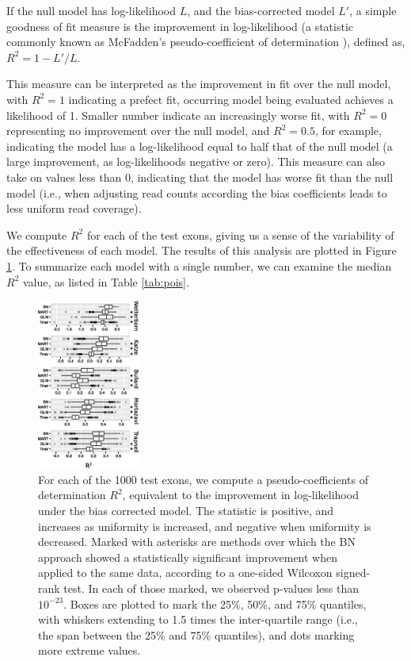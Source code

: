 \documentclass{bioinfo}
\begin{document}
If the null model has log-likelihood $L$, and the bias-corrected model $L'$, a
simple goodness of fit measure is the improvement in log-likelihood (a statistic
commonly known as McFadden's pseudo-coefficient of determination
\citep{McFadden1974}), defined as,
$R^2 = 1 - L'/L$.

This measure can be interpreted as the improvement in fit over the null model,
with $R^2 = 1$ indicating a prefect fit, occurring model being evaluated
achieves a likelihood of 1. Smaller number indicate an increasingly worse fit,
with $R^2 = 0$ representing no improvement over the null model, and $R^2 = 0.5$,
for example, indicating the model has a log-likelihood equal to half that of the
null model (a large improvement, as log-likelihoods negative or zero). This
measure can also take on values less than 0, indicating that the model has worse
fit than the null model (i.e., when adjusting read counts according the bias
coefficients leads to less uniform read coverage).

We compute $R^2$ for each of the test exons, giving us a sense of the variability
of the effectiveness of each model. The results of this analysis are plotted in
Figure \ref{fig:pois}.  To summarize each model with a single number, we can
examine the median $R^2$ value, as listed in Table \ref{tab:pois}.

\begin{figure}
\centerline{\includegraphics[width=0.30\textwidth]{pois-boxplot.eps}}
\caption{For each of the 1000 test exons, we compute a pseudo-coefficients of
determination $R^2$, equivalent to the improvement in log-likelihood under the
bias corrected model. The statistic is positive, and increases as uniformity is
increased, and negative when uniformity is decreased.  Marked with asterisks are
methods over which the BN approach showed a statistically significant improvement
when applied to the same data, according to a one-sided Wilcoxon signed-rank
test. In each of those marked, we observed p-values less than $10^{-23}$.  Boxes
are plotted to mark the 25\%, 50\%, and 75\% quantiles, with whiskers extending
to 1.5 times the inter-quartile range (i.e., the span between the 25\% and 75\%
quantiles), and dots marking more extreme values.
}


    \label{fig:pois}
\end{figure}
\end{document}
